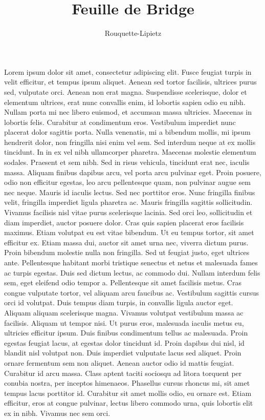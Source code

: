 \documentclass[twoside,a4paper]{article}
\begin{document}
\fancyfoot{}
\fancyhead{}

\title{Feuille de Bridge}
\author{Rouquette-Lipietz}


\begin{triple}
Lorem ipsum dolor sit amet, consectetur adipiscing elit. Fusce feugiat turpis in velit efficitur, et tempus ipsum aliquet. Aenean sed tortor facilisis, ultrices purus sed, vulputate orci. Aenean non erat magna. Suspendisse scelerisque, dolor et elementum ultrices, erat nunc convallis enim, id lobortis sapien odio eu nibh. Nullam porta mi nec libero euismod, et accumsan massa ultricies. Maecenas in lobortis felis. Curabitur at condimentum eros. Vestibulum imperdiet nunc placerat dolor sagittis porta. Nulla venenatis, mi a bibendum mollis, mi ipsum hendrerit dolor, non fringilla nisi enim vel sem. Sed interdum neque at ex mollis tincidunt. In in ex vel nibh ullamcorper pharetra. Maecenas molestie elementum sodales. Praesent et sem nibh. Sed in risus vehicula, tincidunt erat nec, iaculis massa. Aliquam finibus dapibus arcu, vel porta arcu pulvinar eget. Proin posuere, odio non efficitur egestas, leo arcu pellentesque quam, non pulvinar augue sem nec neque.
Mauris id iaculis lectus. Sed nec porttitor eros. Nunc fringilla finibus velit, fringilla imperdiet ligula pharetra ac. Mauris fringilla sagittis sollicitudin. Vivamus facilisis nisl vitae purus scelerisque lacinia. Sed orci leo, sollicitudin et diam imperdiet, auctor posuere dolor. Cras quis sapien placerat eros facilisis maximus. Etiam volutpat eu est vitae bibendum. Ut eu tempus tortor, sit amet efficitur ex. Etiam massa dui, auctor sit amet urna nec, viverra dictum purus. Proin bibendum molestie nulla non fringilla. Sed ut feugiat justo, eget ultrices ante. Pellentesque habitant morbi tristique senectus et netus et malesuada fames ac turpis egestas.
Duis sed dictum lectus, ac commodo dui. Nullam interdum felis sem, eget eleifend odio tempor a. Pellentesque sit amet facilisis metus. Cras congue vulputate tortor, vel aliquam arcu faucibus ac. Vestibulum sagittis cursus orci id volutpat. Duis tempus diam turpis, in convallis ligula auctor eget. Aliquam aliquam scelerisque magna. Vivamus volutpat vestibulum massa ac facilisis. Aliquam ut tempor nisi. Ut purus eros, malesuada iaculis metus eu, ultricies efficitur ipsum. Duis finibus condimentum tellus ac malesuada.
Proin egestas feugiat lacus, at egestas dolor tincidunt id. Proin dapibus dui nisl, id blandit nisl volutpat non. Duis imperdiet vulputate lacus sed aliquet. Proin ornare fermentum sem non aliquet. Aenean auctor odio id mattis feugiat. Curabitur id arcu massa. Class aptent taciti sociosqu ad litora torquent per conubia nostra, per inceptos himenaeos. Phasellus cursus rhoncus mi, sit amet tempus lacus porttitor id. Curabitur sit amet mollis odio, eu ornare est. Etiam efficitur, eros at congue pulvinar, lectus libero commodo urna, quis lobortis elit ex in nibh. Vivamus nec sem orci.

\end{triple}
\end{document}

